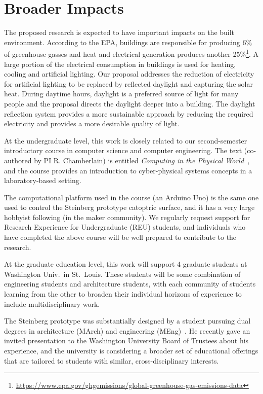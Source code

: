 \section{Broader Impacts}
\label{sec:broader}

The proposed research is expected to have important impacts on the built environment.
According to the EPA, buildings are responsible for producing 6\% of
greenhouse gasses and heat and electrical generation produces another
25\%\footnote{\url{https://www.epa.gov/ghgemissions/global-greenhouse-gas-emissions-data}}.
A large portion of the electrical consumption in buildings is used for
heating, cooling and artificial lighting. Our proposal addresses the
reduction of electricity for artificial lighting to be replaced by
reflected daylight and capturing the solar heat. During daytime hours,
daylight is a preferred source of light for many people and the proposal
directs the daylight deeper into a building. The daylight reflection system
provides a more sustainable approach by reducing the required electricity
and provides a more desirable quality of light.

At the undergraduate level, this work is closely related to
our second-semester introductory course in computer science and
computer engineering.  The
text (co-authored by PI R. Chamberlain) is entitled {\it Computing
in the Physical World}~\cite{cc17}, and the course provides an introduction to
cyber-physical systems concepts in a laboratory-based setting.

The computational platform used in the course (an Arduino Uno) is the
same one used to control the Steinberg prototype catoptric surface,
and it has a very large hobbyist following (in the maker community).
We regularly request support for Research Experience for Undergraduate
(REU) students, and individuals who have completed
the above course will be well prepared to contribute to the research.

At the graduate education level, this work will support 4 graduate
students at Washington Univ.~in St.~Louis.
These students will be some combination of engineering students and
architecture students, with each community of students learning from
the other to broaden their individual horizons of experience to
include multidisciplinary work.

The Steinberg prototype was substantially designed by a student pursuing
dual degrees in architecture (MArch) and engineering (MEng)~\cite{Mitchell18}.
He recently gave an invited presentation to the Washington University Board
of Trustees about his experience, and the university is considering
a broader set of educational offerings that are tailored to students with
similar, cross-disciplinary interests.

